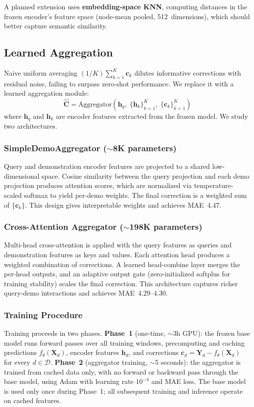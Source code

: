 \documentclass[conference]{IEEEtran}
\begin{document}
A planned extension uses \textbf{embedding-space KNN}, computing distances in the frozen encoder's feature space (node-mean pooled, 512~dimensions), which should better capture semantic similarity.

\subsection{Learned Aggregation}

Naive uniform averaging $(1/K)\sum_{k=1}^K \mathbf{c}_k$ dilutes informative corrections with residual noise, failing to surpass zero-shot performance.
We replace it with a learned aggregation module:
\begin{equation}
\hat{\mathbf{C}} = \mathrm{Aggregator}\!\left(\mathbf{h}_q,\; \{\mathbf{h}_k\}_{k=1}^K,\; \{\mathbf{c}_k\}_{k=1}^K\right)
\end{equation}
where $\mathbf{h}_q$ and $\mathbf{h}_k$ are encoder features extracted from the frozen model.
We study two architectures.

\subsubsection{SimpleDemoAggregator (${\sim}$8K parameters)}
Query and demonstration encoder features are projected to a shared low-dimensional space.
Cosine similarity between the query projection and each demo projection produces attention scores, which are normalized via temperature-scaled softmax to yield per-demo weights.
The final correction is a weighted sum of $\{\mathbf{c}_k\}$.
This design gives interpretable weights and achieves MAE~4.47.

\subsubsection{Cross-Attention Aggregator (${\sim}$198K parameters)}
Multi-head cross-attention is applied with the query features as queries and demonstration features as keys and values.
Each attention head produces a weighted combination of corrections.
A learned head-combine layer merges the per-head outputs, and an adaptive output gate (zero-initialized softplus for training stability) scales the final correction.
This architecture captures richer query-demo interactions and achieves MAE~4.29--4.30.

\subsubsection{Training Procedure}
Training proceeds in two phases.
\textbf{Phase~1} (one-time, ${\sim}$3h GPU): the frozen base model runs forward passes over all training windows, precomputing and caching predictions $f_\theta(\mathbf{X}_d)$, encoder features $\mathbf{h}_d$, and corrections $\mathbf{c}_d = \mathbf{Y}_d - f_\theta(\mathbf{X}_d)$ for every $d \in \mathcal{D}$.
\textbf{Phase~2} (aggregator training, ${\sim}$5 seconds): the aggregator is trained from cached data only, with no forward or backward pass through the base model, using Adam with learning rate $10^{-4}$ and MAE loss.
The base model is used only once during Phase~1; all subsequent training and inference operate on cached features.
\end{document}
